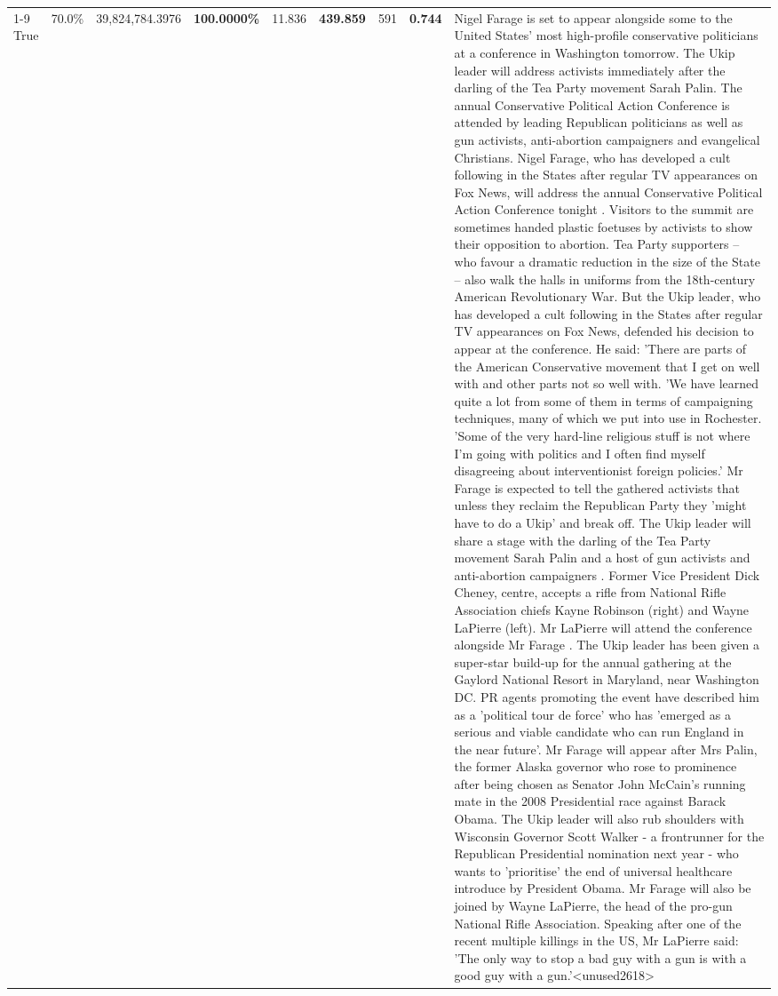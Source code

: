 \begin{table}[H]
\begin{tabular}{lllrlllll}
\cline{1-9}
True & 70.0\% & 39,824,784.3976 & \bfseries \color{red} 100.0000\% & 11.836 & \bfseries \color{red} 439.859 & 591 & \bfseries \color{red} 0.744 & Nigel Farage is set to appear alongside some to the United States' most high-profile conservative politicians at a conference in Washington tomorrow. The Ukip leader will address activists immediately after the darling of the Tea Party movement Sarah Palin. The annual Conservative Political Action Conference is attended by leading Republican politicians as well as gun activists, anti-abortion campaigners and evangelical Christians. Nigel Farage, who has developed a cult following in the States after regular TV appearances on Fox News, will address the annual Conservative Political Action Conference tonight . Visitors to the summit are sometimes handed plastic foetuses by activists to show their opposition to abortion. Tea Party supporters – who favour a dramatic reduction in the size of the State – also walk the halls in uniforms from the 18th-century American Revolutionary War. But the Ukip leader, who has developed a cult following in the States after regular TV appearances on Fox News, defended his decision to appear at the conference. He said: 'There are parts of the American Conservative movement that I get on well with and other parts not so well with. 'We have learned quite a lot from some of them in terms of campaigning techniques, many of which we put into use in Rochester. 'Some of the very hard-line religious stuff is not where I'm going with politics and I often find myself disagreeing about interventionist foreign policies.' Mr Farage is expected to tell the gathered activists that unless they reclaim the Republican Party they 'might have to do a Ukip' and break off. The Ukip leader will share a stage with the darling of the Tea Party movement Sarah Palin and a host of gun activists and anti-abortion campaigners . Former Vice President Dick Cheney, centre, accepts a rifle from National Rifle Association chiefs Kayne Robinson (right) and Wayne LaPierre (left). Mr LaPierre will attend the conference alongside Mr Farage . The Ukip leader has been given a super-star build-up for the annual gathering at the Gaylord National Resort in Maryland, near Washington DC. PR agents promoting the event have described him as a 'political tour de force' who has 'emerged as a serious and viable candidate who can run England in the near future'. Mr Farage will appear after Mrs Palin, the former Alaska governor who rose to prominence after being chosen as Senator John McCain's running mate in the 2008 Presidential race against Barack Obama. The Ukip leader will also rub shoulders with Wisconsin Governor Scott Walker - a frontrunner for the Republican Presidential nomination next year - who wants to 'prioritise' the end of universal healthcare introduce by President Obama. Mr Farage will also be joined by Wayne LaPierre, the head of the pro-gun National Rifle Association. Speaking after one of the recent multiple killings in the US, Mr LaPierre said: 'The only way to stop a bad guy with a gun is with a good guy with a gun.'<unused2618> \\

\end{tabular}
\end{table}
